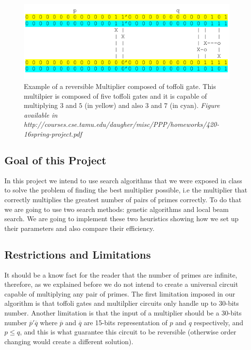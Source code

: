 \documentclass[12pt]{article}
\begin{document}
\begin{figure}[h]
\includegraphics[scale=1.0]{MultiplierExample}
\caption{Example of a reversible Multiplier composed of toffoli gate. This multilpier is composed of five toffoli gates and it is capable of multiplying $3$ and $5$ (in yellow) and also $3$ and $7$ (in cyan). \emph{Figure available in http://courses.cse.tamu.edu/daugher/misc/PPP/homeworks/420-16spring-project.pdf}}
\end{figure}

\subsection{Goal of this Project}
In this project we intend to use search algorithms that we were exposed in class to solve the problem of finding the best multiplier possible, i.e the multiplier that correctly multiplies the greatest number of pairs of primes correctly. To do that we are going to use two search methods: genetic algorithms and local beam search. We are going to implement these two heuristics showing how we set up their parameters and also compare their efficiency.

\subsection{Restrictions and Limitations}
\label{restrictions}
It should be a know fact for the reader that the number of primes are infinite, therefore, as we explained before we do not intend to create a universal circuit capable of multiplying any pair of primes. The first limitation imposed in our algorithm is that toffoli gates and multilplier circuits only handle up to 30-bits number. Another limitation is that the input of a multiplier should be a 30-bits number $\overline{p}'\overline{q}$ where $\overline{p}$ and $\overline{q}$ are 15-bits representation of $p$ and $q$ respectively, and $p \leq q$, and this is what guarantee this circuit to be reversible (otherwise order changing would create a different solution).
\end{document}
